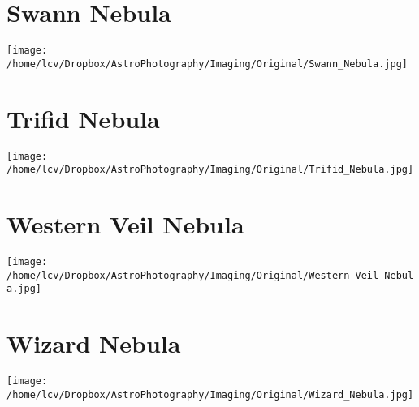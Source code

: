 \section{Swann Nebula}
\texttt{[image: /home/lcv/Dropbox/AstroPhotography/Imaging/Original/Swann\_Nebula.jpg]}
{\footnotesize\color{white}

}
\section{Trifid Nebula}
\texttt{[image: /home/lcv/Dropbox/AstroPhotography/Imaging/Original/Trifid\_Nebula.jpg]}
{\footnotesize\color{white}

}
\section{Western Veil Nebula}
\texttt{[image: /home/lcv/Dropbox/AstroPhotography/Imaging/Original/Western\_Veil\_Nebula.jpg]}
{\footnotesize\color{white}

}
\section{Wizard Nebula}
\texttt{[image: /home/lcv/Dropbox/AstroPhotography/Imaging/Original/Wizard\_Nebula.jpg]}
{\footnotesize\color{white}

}


